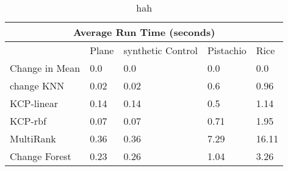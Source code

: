 
\begin{table}[!ht]
\centering
{
\begin{tabular}{ |p{2cm}|p{1.5cm}|p{1.5cm}|p{1.5cm}|p{1.5cm}|}
\hline
\multicolumn{5}{|c|}{Average Run Time (seconds)} \\
\hline

\hline
 & Plane & synthetic Control & Pistachio & Rice \\
\hline
\hline
Change in Mean & 0.0 & 0.0 & 0.0 & 0.0 \\
change KNN & 0.02 & 0.02 & 0.6 & 0.96 \\
KCP-linear & 0.14 & 0.14 & 0.5 & 1.14 \\
KCP-rbf & 0.07 & 0.07 & 0.71 & 1.95 \\
MultiRank & 0.36 & 0.36 & 7.29 & 16.11 \\
Change Forest & 0.23 & 0.26 & 1.04 & 3.26 \\
\hline
\end{tabular}}
\\
\caption{hah}
\vspace{10pt}
\label{tab:yourlabel}
\end{table}
